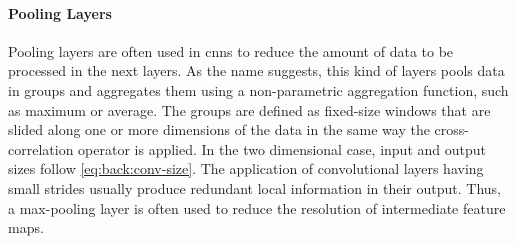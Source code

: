 \paragraph{Pooling Layers}
Pooling layers are often used in \glspl{cnn} to reduce the amount of data to be processed in the next layers.
As the name suggests, this kind of layers pools data in groups and aggregates them using a non-parametric aggregation function, such as maximum or average.
The groups are defined as fixed-size windows that are slided along one or more dimensions of the data in the same way the cross-correlation operator is applied.
In the two dimensional case, input and output sizes follow \ref{eq:back:conv-size}.
The application of convolutional layers having small strides usually produce redundant local information in their output.
Thus, a max-pooling layer is often used to reduce the resolution of intermediate feature maps.

